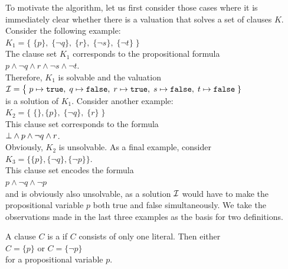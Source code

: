 To motivate the algorithm, let us first consider those cases where
it is immediately clear whether there is a valuation that solves a set of clauses $K$.
Consider the following example: \\[0.2cm]
\hspace*{1.3cm} 
$K_1 = \bigl\{\; \{p\},\; \{\neg q\},\; \{r\},\; \{\neg s\}, \; \{\neg t\} \;\bigr\}$ 
\\[0.2cm]
The clause set $K_1$ corresponds to the propositional formula
\\[0.2cm]
\hspace*{1.3cm}
$p \wedge \neg q \wedge r \wedge \neg s \wedge \neg t$.
\\[0.2cm]
Therefore, $K_1$ is solvable and the valuation  \\[0.2cm]
\hspace*{1.3cm} 
$\mathcal{I} = \bigl\{\; p \mapsto \texttt{true},\; q \mapsto \texttt{false},\; r \mapsto \texttt{true},\; s \mapsto
\texttt{false},\; t \mapsto \texttt{false}\;\}$
\\[0.2cm]
is a solution of $K_1$. Consider another example: \\[0.2cm]
\hspace*{1.3cm} 
$K_2 = \bigl\{\; \{\}, \{p\},\; \{\neg q\},\; \{r\}\; \bigr\}$ 
\\[0.2cm]
This clause set corresponds to the formula
\\[0.2cm]
\hspace*{1.3cm}
$\bot \wedge p \wedge \neg q \wedge r$.
\\[0.2cm]
Obviously, $K_2$ is unsolvable. As a final example, consider
\\[0.2cm]
\hspace*{1.3cm} $K_3 = \bigl\{ \{p\}, \{\neg q\}, \{\neg p\} \bigr\}$.
\\[0.2cm]
This clause set encodes the formula
\\[0.2cm]
\hspace*{1.3cm}
$p \wedge \neg q \wedge \neg p $
\\[0.2cm]
and is obviously also unsolvable, as a solution $\mathcal{I}$ would have to make the propositional variable $p$ both
true and false simultaneously. We take the observations made in the last three examples as the basis for two
definitions.

\begin{Definition}
  A clause $C$ is a  if $C$ consists of only one literal.
  Then either
  \\[0.2cm]
  \hspace*{1.3cm}
  $C = \{p\}$ \quad or \quad $C = \{\neg p\}$ 
  \\[0.2cm]
  for a propositional variable $p$. \eox
\end{Definition}

